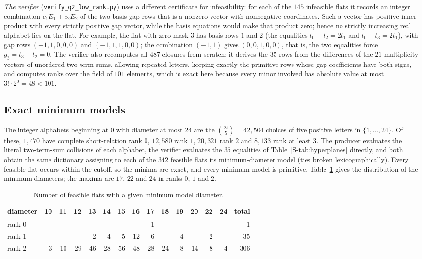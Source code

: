 \documentclass[11pt,reqno]{amsart}
\theoremstyle{plain}
\theoremstyle{definition}
\theoremstyle{plain}
\theoremstyle{plain}
\theoremstyle{plain}
\theoremstyle{plain}
\theoremstyle{plain}
\theoremstyle{plain}
\theoremstyle{definition}
\theoremstyle{definition}
\theoremstyle{definition}
\theoremstyle{plain}
\begin{document}
\emph{The verifier} (\texttt{verify\_q2\_low\_rank.py}) uses a different
certificate for infeasibility: for each of the $145$ infeasible flats it
records an integer combination $c_1E_1+c_2E_2$ of the two basis gap rows
that is a nonzero vector with nonnegative coordinates. Such a vector has
positive inner product with every strictly positive gap vector, while the
basis equations would make that product zero; hence no strictly increasing
real alphabet lies on the flat. For example, the flat with zero mask $3$
has basis rows $1$ and $2$ (the equalities $t_0+t_2=2t_1$ and
$t_0+t_3=2t_1$), with gap rows $(-1,1,0,0,0)$ and $(-1,1,1,0,0)$; the
combination $(-1,1)$ gives $(0,0,1,0,0)$, that is, the two equalities force
$g_3=t_3-t_2=0$. The verifier also recomputes all $487$ closures from
scratch: it derives the $35$ rows from the differences of the $21$
multiplicity vectors of unordered two-term sums, allowing repeated letters, keeping exactly the primitive rows whose
gap coefficients have both signs, and computes ranks over the field of
$101$ elements, which is exact here because every minor involved has
absolute value at most $3!\cdot2^3=48<101$.

\subsection{Exact minimum models}\label{S-supp:models}
The integer alphabets beginning at $0$ with diameter at most $24$ are the
$\binom{24}5=42{,}504$ choices of five positive letters in
$\{1,\ldots,24\}$. Of these, $1{,}470$ have complete short-relation rank
$0$, $12{,}580$ rank $1$, $20{,}321$ rank $2$ and $8{,}133$ rank at least
$3$. The producer evaluates the literal two-term-sum collisions of each
alphabet, the verifier evaluates the $35$ equalities of
Table~\ref{S-tab:hyperplanes} directly, and both obtain the same dictionary
assigning to each of the $342$ feasible flats its minimum-diameter model
(ties broken lexicographically). Every feasible flat occurs within the
cutoff, so the minima are exact, and every minimum model is primitive.
Table~\ref{S-tab:distribution} gives the distribution of the minimum
diameters; the maxima are $17$, $22$ and $24$ in ranks $0$, $1$ and $2$.

\begin{table}[htbp]
\caption{Number of feasible flats with a given minimum model diameter.}
\label{S-tab:distribution}
\begin{center}\small
\begin{tabular}{@{}lrrrrrrrrrrrrrr@{}}
\toprule
diameter & 10 & 11 & 12 & 13 & 14 & 15 & 16 & 17 & 18 & 19 & 20 & 22 & 24 & total\\
\midrule
rank 0 & & & & & & & & 1 & & & & & & 1\\
rank 1 & & & & 2 & 4 & 5 & 12 & 6 & & 4 & & 2 & & 35\\
rank 2 & 3 & 10 & 29 & 46 & 28 & 56 & 48 & 28 & 24 & 8 & 14 & 8 & 4 & 306\\
\bottomrule
\end{tabular}
\end{center}
\end{table}
\end{document}
